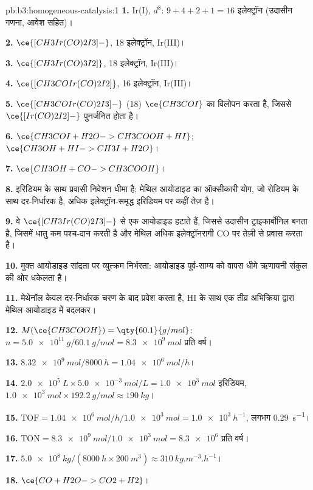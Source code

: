 \begin{solution}{pb:b3:homogeneous-catalysis:1}
\textbf{1.} Ir(I), $d^8$: $9 + 4 + 2 + 1 = 16$ इलेक्ट्रॉन (उदासीन गणना, आवेश सहित)।

\textbf{2.} $\ce{[CH3Ir(CO)2I3]-}$, 18 इलेक्ट्रॉन, Ir(III)।

\textbf{3.} $\ce{[CH3Ir(CO)3I2]}$, 18 इलेक्ट्रॉन, Ir(III)।

\textbf{4.} $\ce{[CH3COIr(CO)2I2]}$, 16 इलेक्ट्रॉन, Ir(III)।

\textbf{5.} $\ce{[CH3COIr(CO)2I3]-}$ (18) $\ce{CH3COI}$ का विलोपन करता है, जिससे $\ce{[Ir(CO)2I2]-}$ पुनर्जनित होता है।

\textbf{6.} $\ce{CH3COI + H2O -> CH3COOH + HI}$; $\ce{CH3OH + HI -> CH3I + H2O}$।

\textbf{7.} $\ce{CH3OH + CO -> CH3COOH}$।

\textbf{8.} इरिडियम के साथ प्रवासी निवेशन धीमा है; मेथिल आयोडाइड का ऑक्सीकारी योग,
जो रोडियम के साथ दर-निर्धारक है, अधिक
इलेक्ट्रॉन-समृद्ध इरिडियम पर कहीं तेज़ है।

\textbf{9.} वे $\ce{[CH3Ir(CO)2I3]-}$ से एक आयोडाइड हटाते हैं, जिससे उदासीन ट्राइकार्बोनिल बनता है, जिसमें
धातु कम पश्च-दान करती है और मेथिल अधिक इलेक्ट्रॉनरागी CO पर
तेज़ी से प्रवास करता है।

\textbf{10.} मुक्त आयोडाइड सांद्रता पर व्युत्क्रम निर्भरता: आयोडाइड
पूर्व-साम्य को वापस धीमे ऋणायनी संकुल की ओर धकेलता है।

\textbf{11.} मेथेनॉल केवल दर-निर्धारक चरण के बाद प्रवेश करता है, HI के साथ एक तीव्र अभिक्रिया द्वारा
मेथिल आयोडाइड में बदलकर।

\textbf{12.} $M(\ce{CH3COOH}) = \qty{60.1}{g/mol}$: $n = \qty{5.0e11}{g}/\qty{60.1}{g/mol} = \qty{8.3e9}{mol}$ प्रति वर्ष।

\textbf{13.} $\qty{8.32e9}{mol}/\qty{8000}{h} = \qty{1.04e6}{mol/h}$।

\textbf{14.} $\qty{2.0e5}{L} \times \qty{5.0e-3}{mol/L} = \qty{1.0e3}{mol}$ इरिडियम, $\qty{1.0e3}{mol} \times \qty{192.2}{g/mol} \approx \qty{190}{kg}$।

\textbf{15.} $\mathrm{TOF} = \qty{1.04e6}{mol/h}/\qty{1.0e3}{mol} = \qty{1.0e3}{h^{-1}}$, लगभग \qty{0.29}{s^{-1}}।

\textbf{16.} $\mathrm{TON} = \qty{8.3e9}{mol}/\qty{1.0e3}{mol} = \num{8.3e6}$ प्रति वर्ष।

\textbf{17.} $\qty{5.0e8}{kg}/(\qty{8000}{h} \times \qty{200}{m^3}) \approx \qty{310}{kg.m^{-3}.h^{-1}}$।

\textbf{18.} $\ce{CO + H2O -> CO2 + H2}$।


\end{solution}
